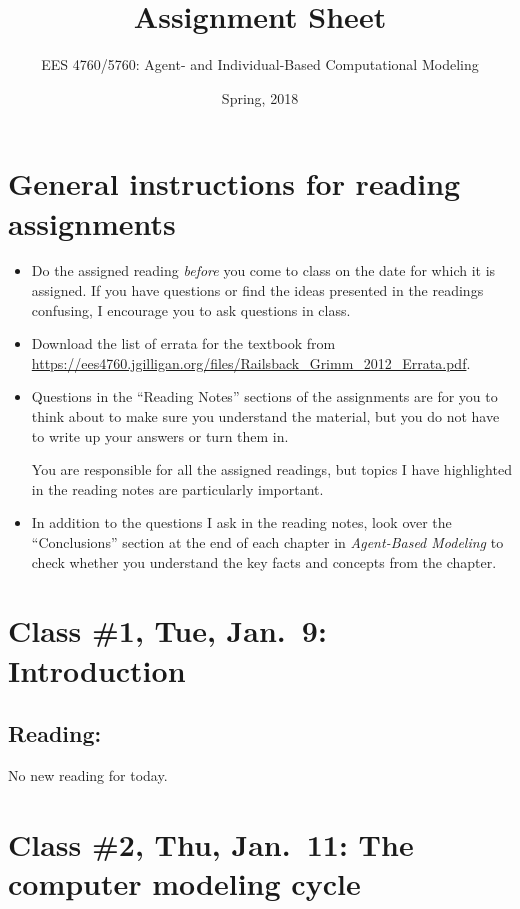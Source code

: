 \documentclass[]{article}
\title{Assignment Sheet}
\author{EES 4760/5760: Agent- and Individual-Based Computational Modeling}
\date{Spring, 2018}
\begin{document}
\maketitle

\hypertarget{general-instructions-for-reading-assignments}{%
\section{General instructions for reading
assignments}\label{general-instructions-for-reading-assignments}}

\begin{itemize}
\item
  Do the assigned reading \emph{before\/} you come to class on the date
  for which it is assigned. If you have questions or find the ideas
  presented in the readings confusing, I encourage you to ask questions
  in class.
\item
  Download the list of errata for the textbook from
  \url{https://ees4760.jgilligan.org/files/Railsback_Grimm_2012_Errata.pdf}.
\item
  Questions in the ``Reading Notes'' sections of the assignments are for
  you to think about to make sure you understand the material, but you
  do not have to write up your answers or turn them in.

  You are responsible for all the assigned readings, but topics I have
  highlighted in the reading notes are particularly important.
\item
  In addition to the questions I ask in the reading notes, look over the
  ``Conclusions'' section at the end of each chapter in
  \emph{Agent-Based Modeling} to check whether you understand the key
  facts and concepts from the chapter.
\end{itemize}

\hypertarget{class-1-tue-jan.9-introduction}{%
\section{Class \#1, Tue, Jan.~9:
Introduction}\label{class-1-tue-jan.9-introduction}}

\hypertarget{reading}{%
\subsection{Reading:}\label{reading}}

No new reading for today.

\hypertarget{class-2-thu-jan.11-the-computer-modeling-cycle}{%
\section{Class \#2, Thu, Jan.~11: The computer modeling
cycle}\label{class-2-thu-jan.11-the-computer-modeling-cycle}}
\end{document}
